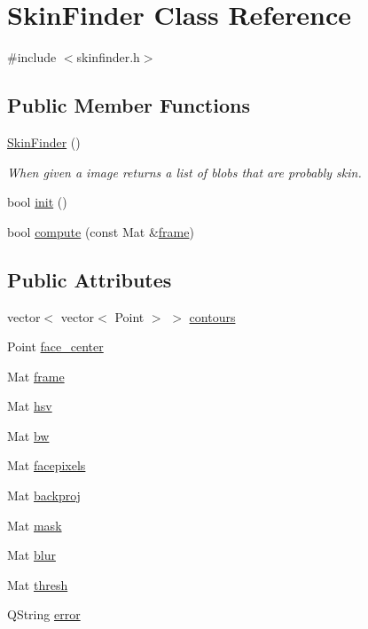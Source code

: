 \hypertarget{class_skin_finder}{
\section{SkinFinder Class Reference}
\label{class_skin_finder}
}


{\ttfamily \#include $<$skinfinder.h$>$}

\subsection*{Public Member Functions}
\begin{DoxyCompactItemize}
\item 
\hyperlink{class_skin_finder_aac7af0cb4507fc573997c4fb63ad21f0}{SkinFinder} ()
\begin{DoxyCompactList}\small\item\em When given a image returns a list of blobs that are probably skin. \item\end{DoxyCompactList}\item 
bool \hyperlink{class_skin_finder_a8c761b35fd96ad32224810d363d8915e}{init} ()
\item 
bool \hyperlink{class_skin_finder_ac183e04f82d087fdd04e184e9283fc33}{compute} (const Mat \&\hyperlink{class_skin_finder_ae7f9082d757d32f18c06b1f4ab600467}{frame})
\end{DoxyCompactItemize}
\subsection*{Public Attributes}
\begin{DoxyCompactItemize}
\item 
vector$<$ vector$<$ Point $>$ $>$ \hyperlink{class_skin_finder_a6921f1002639c7a369f637b229de376a}{contours}
\item 
Point \hyperlink{class_skin_finder_a55330ad48d6c72f9a0f9d16a874b39ce}{face\_\-center}
\item 
Mat \hyperlink{class_skin_finder_ae7f9082d757d32f18c06b1f4ab600467}{frame}
\item 
Mat \hyperlink{class_skin_finder_a5e36bd9b188370eb528beeed691d6d2f}{hsv}
\item 
Mat \hyperlink{class_skin_finder_a325d75cde01cb02243af4dee842f6512}{bw}
\item 
Mat \hyperlink{class_skin_finder_a93fd2ba0d7494ec4aa2443352fe4f961}{facepixels}
\item 
Mat \hyperlink{class_skin_finder_aed495dc76d3c5f96eb97805d49923e59}{backproj}
\item 
Mat \hyperlink{class_skin_finder_a40173df66e4ec87e0c69c4858e49f7a7}{mask}
\item 
Mat \hyperlink{class_skin_finder_abc551e869a5beddbc7d4c956653d414e}{blur}
\item 
Mat \hyperlink{class_skin_finder_a199a4f558e062704a4c24d65801e47ba}{thresh}
\item 
QString \hyperlink{class_skin_finder_a6487c08c34a8330230b06918c89bbd4d}{error}
\end{DoxyCompactItemize}



